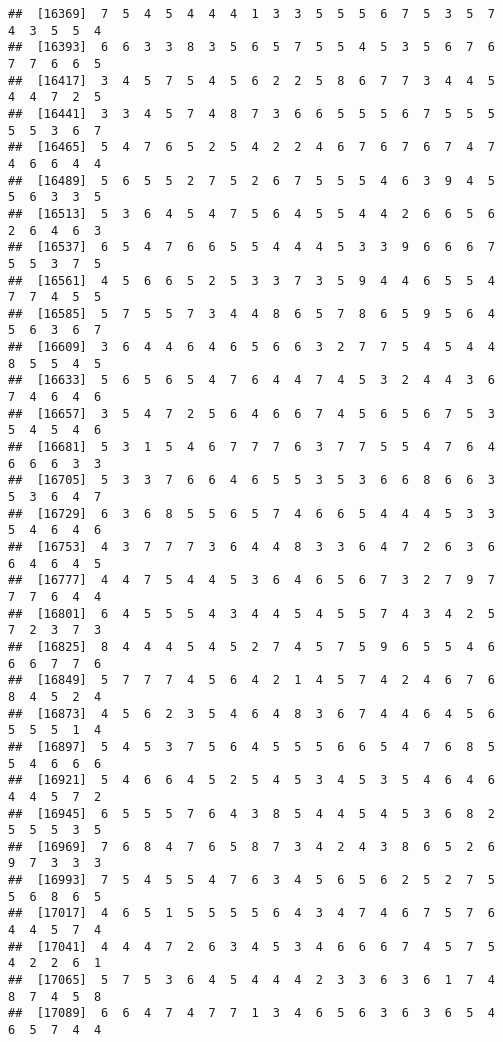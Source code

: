 \documentclass[
]{book}
\begin{document}
\begin{verbatim}
##  [16369]  7  5  4  5  4  4  4  1  3  3  5  5  5  6  7  5  3  5  7  4  3  5  5  4
##  [16393]  6  6  3  3  8  3  5  6  5  7  5  5  4  5  3  5  6  7  6  7  7  6  6  5
##  [16417]  3  4  5  7  5  4  5  6  2  2  5  8  6  7  7  3  4  4  5  4  4  7  2  5
##  [16441]  3  3  4  5  7  4  8  7  3  6  6  5  5  5  6  7  5  5  5  5  5  3  6  7
##  [16465]  5  4  7  6  5  2  5  4  2  2  4  6  7  6  7  6  7  4  7  4  6  6  4  4
##  [16489]  5  6  5  5  2  7  5  2  6  7  5  5  5  4  6  3  9  4  5  5  6  3  3  5
##  [16513]  5  3  6  4  5  4  7  5  6  4  5  5  4  4  2  6  6  5  6  2  6  4  6  3
##  [16537]  6  5  4  7  6  6  5  5  4  4  4  5  3  3  9  6  6  6  7  5  5  3  7  5
##  [16561]  4  5  6  6  5  2  5  3  3  7  3  5  9  4  4  6  5  5  4  7  7  4  5  5
##  [16585]  5  7  5  5  7  3  4  4  8  6  5  7  8  6  5  9  5  6  4  5  6  3  6  7
##  [16609]  3  6  4  4  6  4  6  5  6  6  3  2  7  7  5  4  5  4  4  8  5  5  4  5
##  [16633]  5  6  5  6  5  4  7  6  4  4  7  4  5  3  2  4  4  3  6  7  4  6  4  6
##  [16657]  3  5  4  7  2  5  6  4  6  6  7  4  5  6  5  6  7  5  3  5  4  5  4  6
##  [16681]  5  3  1  5  4  6  7  7  7  6  3  7  7  5  5  4  7  6  4  6  6  6  3  3
##  [16705]  5  3  3  7  6  6  4  6  5  5  3  5  3  6  6  8  6  6  3  5  3  6  4  7
##  [16729]  6  3  6  8  5  5  6  5  7  4  6  6  5  4  4  4  5  3  3  5  4  6  4  6
##  [16753]  4  3  7  7  7  3  6  4  4  8  3  3  6  4  7  2  6  3  6  6  4  6  4  5
##  [16777]  4  4  7  5  4  4  5  3  6  4  6  5  6  7  3  2  7  9  7  7  7  6  4  4
##  [16801]  6  4  5  5  5  4  3  4  4  5  4  5  5  7  4  3  4  2  5  7  2  3  7  3
##  [16825]  8  4  4  4  5  4  5  2  7  4  5  7  5  9  6  5  5  4  6  6  6  7  7  6
##  [16849]  5  7  7  7  4  5  6  4  2  1  4  5  7  4  2  4  6  7  6  8  4  5  2  4
##  [16873]  4  5  6  2  3  5  4  6  4  8  3  6  7  4  4  6  4  5  6  5  5  5  1  4
##  [16897]  5  4  5  3  7  5  6  4  5  5  5  6  6  5  4  7  6  8  5  5  4  6  6  6
##  [16921]  5  4  6  6  4  5  2  5  4  5  3  4  5  3  5  4  6  4  6  4  4  5  7  2
##  [16945]  6  5  5  5  7  6  4  3  8  5  4  4  5  4  5  3  6  8  2  5  5  5  3  5
##  [16969]  7  6  8  4  7  6  5  8  7  3  4  2  4  3  8  6  5  2  6  9  7  3  3  3
##  [16993]  7  5  4  5  5  4  7  6  3  4  5  6  5  6  2  5  2  7  5  5  6  8  6  5
##  [17017]  4  6  5  1  5  5  5  5  6  4  3  4  7  4  6  7  5  7  6  4  4  5  7  4
##  [17041]  4  4  4  7  2  6  3  4  5  3  4  6  6  6  7  4  5  7  5  4  2  2  6  1
##  [17065]  5  7  5  3  6  4  5  4  4  4  2  3  3  6  3  6  1  7  4  8  7  4  5  8
##  [17089]  6  6  4  7  4  7  7  1  3  4  6  5  6  3  6  3  6  5  4  6  5  7  4  4

\end{verbatim}
\end{document}
